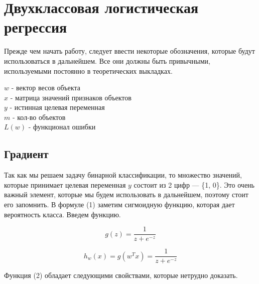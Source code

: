 \documentclass{article}
\begin{document}
	
	\section{Двухклассовая логистическая регрессия} %
	
	\begin{minipage}{0.5\textwidth}
		Прежде чем начать работу, следует ввести некоторые обозначения, которые будут использоваться в дальнейшем. Все они должны быть привычными, используемыми постоянно в теоретических выкладках.
	\end{minipage}
	\begin{minipage}{0.5\textwidth}
		\begin{flushright}
			$w$ - вектор весов объекта \\
			$x$ - матрица значений признаков объектов \\
			$y$ - истинная целевая переменная \\
			$m$ - кол-во объектов \\
			$L(w)$ - функционал ошибки
		\end{flushright}
	\end{minipage}
	
	
	\subsection{Градиент}
	
	Так как мы решаем задачу бинарной классификации, то множество значений, которые принимает целевая переменная $y$ состоит из 2 цифр --- \{1, 0\}. Это очень важный элемент, которые мы будем использовать в дальнейшем, поэтому стоит его запомнить. В формуле (1) заметим сигмоидную функцию, которая дает вероятность класса. Введем функцию.
	
	\newpage
	\begin{equation}
		g(z) = \frac{1}{z + e^{-z}} 
	\end{equation}

	\begin{equation*}
		h_w(x) = g(w^Tx) = \frac{1}{z + e^{-z}}
	\end{equation*}
	
	\begin{center}
		Функция (2) обладает следующими свойствами, которые нетрудно доказать.
	\end{center}
	
\end{document}
